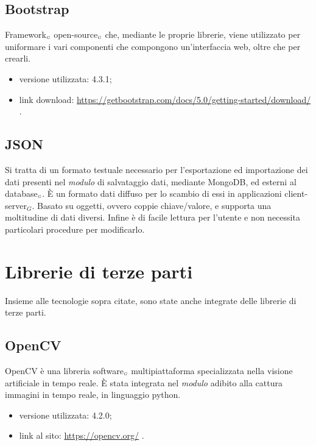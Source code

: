 \subsection{Bootstrap}\label{TecnologieBootstrap}
Framework$_{\scaleto{G}{3pt}}$ open-source$_{\scaleto{G}{3pt}}$ che, mediante le proprie librerie, viene utilizzato per uniformare i vari componenti che compongono un'interfaccia web, oltre che per crearli.

\begin{itemize}
  \item versione utilizzata: 4.3.1;
  \item link download: \url{https://getbootstrap.com/docs/5.0/getting-started/download/} .
\end{itemize}


\subsection{JSON}\label{TecnologieJson}
Si tratta di un formato testuale necessario per l'esportazione ed importazione dei dati presenti nel \textit{modulo} di salvataggio dati, mediante MongoDB, ed esterni al database$_{\scaleto{G}{3pt}}$.
È un formato dati diffuso per lo scambio di essi in applicazioni client-server$_G$.
Basato su oggetti, ovvero coppie chiave/valore, e supporta una moltitudine di dati diversi. Infine è di facile lettura per l'utente e non necessita particolari procedure per modificarlo.


\section{Librerie di terze parti}\label{LibrerieDiTerzeParti}
Insieme alle tecnologie sopra citate, sono state anche integrate delle librerie di terze parti.

\subsection{OpenCV}\label{LibrerieOpenCV}
OpenCV è una libreria software$_{\scaleto{G}{3pt}}$ multipiattaforma specializzata nella visione artificiale in tempo reale.
È stata integrata nel \textit{modulo} adibito alla cattura immagini in tempo reale, in linguaggio python.

\begin{itemize}
  \item versione utilizzata: 4.2.0;
  \item link al sito: \url{https://opencv.org/} .
\end{itemize}

